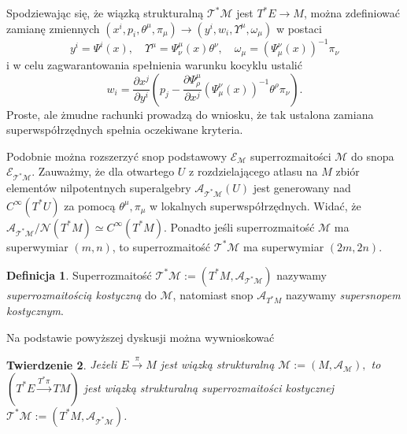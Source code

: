 \documentclass[11pt,a4paper]{report}
\newtheorem{theorem}{Twierdzenie}[section]
\theoremstyle{definition}
\newtheorem{definition}[theorem]{Definicja}
\begin{document}
Spodziewając się, że wiązką strukturalną $\mathcal{T^*M}$ jest $T^*E \rightarrow M$, można zdefiniować zamianę zmiennych $(x^i, p_i, \theta^\mu, \pi_\mu) \rightarrow (y^i, w_i, \Upsilon^\mu, \omega_\mu)$ w postaci
\begin{equation}
\label{eq:M1}
y^i=\Psi^i(x),\quad \Upsilon^\mu=\Psi^\mu_\nu(x)\theta^\nu, \quad
\omega_\mu =(\Psi_\mu^\nu(x))^{-1} \pi_\nu
\end{equation}
i w celu zagwarantowania spełnienia warunku kocyklu ustalić
\begin{equation}
\label{eq:M2}
w_i =\frac{\partial x^j}{\partial y^i}\left(p_j-\frac{\partial \Psi^\mu_\rho}{\partial x^j}(\Psi^\nu_\mu (x))^{-1} \theta^\rho \pi_\nu\right).
\end{equation}
Proste, ale żmudne rachunki prowadzą do wniosku, że tak ustalona zamiana superwspółrzędnych spełnia oczekiwane kryteria.

Podobnie można rozszerzyć snop podstawowy $\mathcal{E_M}$ superrozmaitości $\mathcal{M}$ do snopa $\mathcal{E_{T^*M}}$. Zauważmy, że dla otwartego $U$ z rozdzielającego atlasu na $M$ zbiór elementów nilpotentnych superalgebry $\mathcal{A_{T^*M}}(U)$ jest generowany nad $C^\infty(T^*U)$ za pomocą $\theta^\mu, \pi_\mu$ w lokalnych superwspółrzędnych. Widać, że $\mathcal{A_{T^*M}}/\mathcal{N}(T^*M) \simeq C^\infty(T^*M)$. Ponadto jeśli superrozmaitość $\mathcal{M}$ ma superwymiar $(m,n)$, to superrozmaitość $\mathcal{T^*M}$ ma superwymiar $(2m,2n)$.

\begin{definition}
Superrozmaitość $\mathcal{T^*M} := (T^*M, \mathcal{A_{T^*M}})$ nazywamy \textit{superrozmaitością kostyczną} do $\mathcal{M}$, natomiast snop $\mathcal{A}_{T^*M}$ nazywamy \textit{supersnopem kostycznym}.
\end{definition}

Na podstawie powyższej dyskusji można wywnioskować

\begin{theorem}
Jeżeli $E\stackrel{\pi}{\rightarrow} M$ jest wiązką strukturalną $\mathcal{M} := (M, \mathcal{A_M}),$ to $(T^*E\stackrel{T^*\pi}{\rightarrow} TM)$ jest wiązką strukturalną superrozmaitości kostycznej $\mathcal{T^*M} := (T^*M, \mathcal{A_{T^*M}})$.
\end{theorem}
\end{document}
